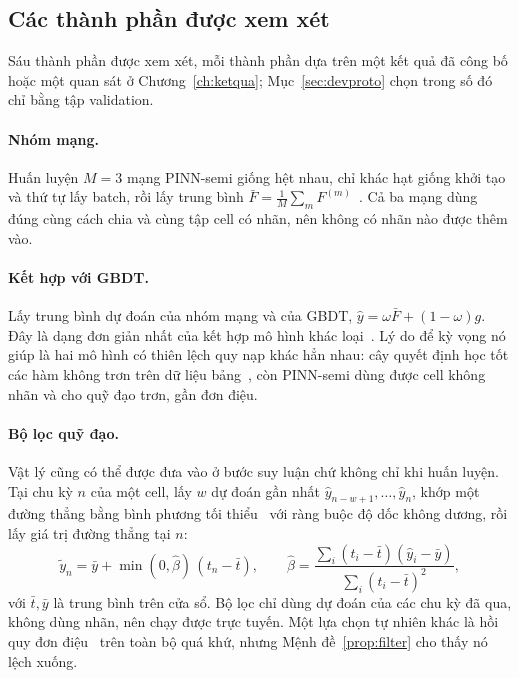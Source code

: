 \documentclass[12pt,a4paper,oneside]{report}
\theoremstyle{plain}
\theoremstyle{definition}
\begin{document}
\subsection{Các thành phần được xem xét}\label{sec:candidates}

Sáu thành phần được xem xét, mỗi thành phần dựa trên một kết quả đã công bố hoặc một quan sát ở Chương~\ref{ch:ketqua}; Mục~\ref{sec:devproto} chọn trong số đó chỉ bằng tập validation.

\paragraph{Nhóm mạng.} Huấn luyện $M = 3$ mạng PINN-semi giống hệt nhau, chỉ khác hạt giống khởi tạo và thứ tự lấy
batch, rồi lấy trung bình $\bar F = \frac{1}{M}\sum_m F^{(m)}$~\cite{lakshminarayanan2017}. Cả ba mạng dùng đúng
cùng cách chia và cùng tập cell có nhãn, nên không có nhãn nào được thêm vào.

\paragraph{Kết hợp với GBDT.} Lấy trung bình dự đoán của nhóm mạng và của GBDT, $\hat y = \omega \bar F + (1-\omega) g$.
Đây là dạng đơn giản nhất của kết hợp mô hình khác loại~\cite{wolpert1992}. Lý do để kỳ vọng nó giúp là hai mô hình
có thiên lệch quy nạp khác hẳn nhau: cây quyết định học tốt các hàm không trơn trên dữ liệu bảng~\cite{grinsztajn2022},
còn PINN-semi dùng được cell không nhãn và cho quỹ đạo trơn, gần đơn điệu.

\paragraph{Bộ lọc quỹ đạo.} Vật lý cũng có thể được đưa vào ở bước suy luận chứ không chỉ khi huấn luyện. Tại chu kỳ
$n$ của một cell, lấy $w$ dự đoán gần nhất $\hat y_{n-w+1}, \dots, \hat y_n$, khớp một đường thẳng bằng bình phương
tối thiểu~\cite{cleveland1979} với ràng buộc độ dốc không dương, rồi lấy giá trị đường thẳng tại $n$:
\begin{equation}\label{eq:trend}
\tilde y_n = \bar y + \min(0, \hat\beta)\,(t_n - \bar t), \qquad
\hat\beta = \frac{\sum_i (t_i - \bar t)(\hat y_i - \bar y)}{\sum_i (t_i - \bar t)^2},
\end{equation}
với $\bar t, \bar y$ là trung bình trên cửa sổ. Bộ lọc chỉ dùng dự đoán của các chu kỳ đã qua, không dùng nhãn,
nên chạy được trực tuyến. Một lựa chọn tự nhiên khác là hồi quy đơn điệu~\cite{barlow1972} trên toàn bộ quá khứ,
nhưng Mệnh đề~\ref{prop:filter} cho thấy nó lệch xuống.
\end{document}
